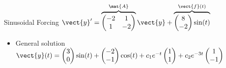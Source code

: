 \begin{frame}{Sinusoidal Forcing \qquad $\vect{y}'=\overbrace{\begin{pmatrix}-2&1\\1&-2\end{pmatrix}}^{\mat{A}}\vect{y}+\overbrace{\begin{pmatrix}8\\-2\end{pmatrix}\sin(t)}^{\vect{f}(t)}$}
\begin{itemize}
\[\begin{array}{rr|rr|r}
      {\color{blue}0}&{\color{blue}1}&{\color{blue}-1}&{\color{blue}2}&{\color{blue}0}
    \end{array}\right]
    \sim\left[\begin{array}{rrrr|r}
      1&0&0&0&3\\
      0&1&0&0&0\\
      0&0&1&0&-2\\
      0&0&0&1&-1
    \end{array}\right]
    \quad\Longrightarrow\quad
    \vect{a}=\begin{pmatrix}3\\0\end{pmatrix}
    \qquad
    \vect{b}=\begin{pmatrix}-2\\-1\end{pmatrix}
  \]
  \item General solution
  $\vect{y}(t)=\begin{pmatrix}3\\0\end{pmatrix}\sin(t)
  +\begin{pmatrix}-2\\-1\end{pmatrix}\cos(t)
  +c_1e^{-t}\begin{pmatrix}1\\1\end{pmatrix}
  +c_2e^{-3t}\begin{pmatrix}1\\-1\end{pmatrix}$
\end{itemize}
\end{frame}
